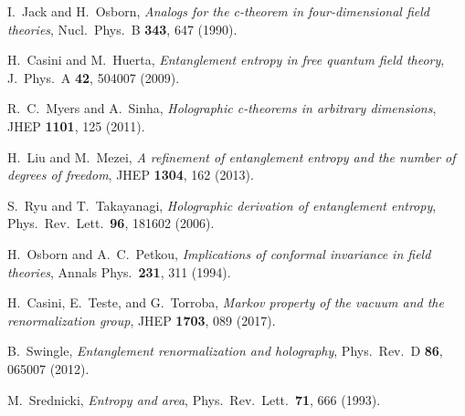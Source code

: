 \documentclass[11pt]{article}
\begin{document}
\begin{thebibliography}{99}
I.~Jack and H.~Osborn, \emph{Analogs for the c-theorem in four-dimensional field theories}, Nucl.\ Phys.\ B \textbf{343}, 647 (1990).

H.~Casini and M.~Huerta, \emph{Entanglement entropy in free quantum field theory}, J.\ Phys.\ A \textbf{42}, 504007 (2009).

R.~C.~Myers and A.~Sinha, \emph{Holographic c-theorems in arbitrary dimensions}, JHEP \textbf{1101}, 125 (2011).

H.~Liu and M.~Mezei, \emph{A refinement of entanglement entropy and the number of degrees of freedom}, JHEP \textbf{1304}, 162 (2013).

S.~Ryu and T.~Takayanagi, \emph{Holographic derivation of entanglement entropy}, Phys.\ Rev.\ Lett.\ \textbf{96}, 181602 (2006).

H.~Osborn and A.~C.~Petkou, \emph{Implications of conformal invariance in field theories}, Annals Phys.\ \textbf{231}, 311 (1994).

H.~Casini, E.~Teste, and G.~Torroba, \emph{Markov property of the vacuum and the renormalization group}, JHEP \textbf{1703}, 089 (2017).

B.~Swingle, \emph{Entanglement renormalization and holography}, Phys.\ Rev.\ D \textbf{86}, 065007 (2012).

M.~Srednicki, \emph{Entropy and area}, Phys.\ Rev.\ Lett.\ \textbf{71}, 666 (1993).

\end{thebibliography}
\end{document}

